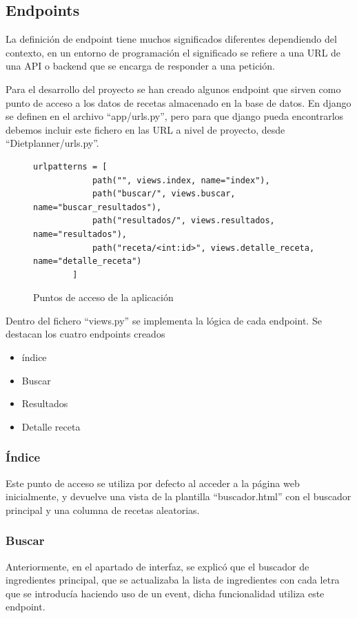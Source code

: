 \subsection{Endpoints}
La definición de \gls{endpoint} tiene muchos significados diferentes dependiendo del contexto, en un entorno de programación el significado se refiere a una URL de una \gls{API} o \gls{backend} que se encarga de responder a una petición. 

Para el desarrollo del proyecto se han creado algunos \gls{endpoint} que sirven como punto de acceso a los datos de recetas almacenado en la base de datos. En \Gls{django} se definen en el archivo ``app/urls.py'', pero para que \Gls{django} pueda encontrarlos debemos incluir este fichero en las URL a nivel de proyecto, desde ``Dietplanner/urls.py''. 

\begin{figure}
    \centering
    \begin{lstlisting}[style=consola]
        urlpatterns = [
            path("", views.index, name="index"),
            path("buscar/", views.buscar, name="buscar_resultados"),
            path("resultados/", views.resultados, name="resultados"),
            path("receta/<int:id>", views.detalle_receta, name="detalle_receta")
        ]
    \end{lstlisting}
    \caption{Puntos de acceso de la aplicación}
    \label{sni:endpoints}
\end{figure}

\newpage
Dentro del fichero ``views.py'' se implementa la lógica de cada \gls{endpoint}. Se destacan los cuatro \glspl{endpoint} creados
\begin{itemize}
    \item índice
    \item Buscar
    \item Resultados
    \item Detalle receta
\end{itemize}

\subsubsection{Índice}
Este punto de acceso se utiliza por defecto al acceder a la página web inicialmente, y devuelve una vista de la plantilla ``buscador.html'' con el buscador principal y una columna de recetas aleatorias. 

\subsubsection{Buscar}
Anteriormente, en el apartado de interfaz, se explicó que el buscador de ingredientes principal, que se actualizaba la lista de ingredientes con cada letra que se introducía haciendo uso de un \gls{event}, dicha funcionalidad utiliza este \gls{endpoint}.

